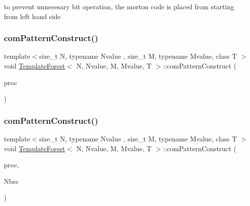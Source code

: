 to prevent unnecesary bit operation, the morton code is placed from starting from left hand side \mbox{\label{classTemplateForest_aa8695400b06ec321a3378ea68dafe4a9}} 
\subsubsection{\texorpdfstring{com\+Pattern\+Construct()}{comPatternConstruct()}\hspace{0.1cm}{\footnotesize\ttfamily [1/2]}}
{\footnotesize\ttfamily template$<$size\+\_\+t N, typename Nvalue , size\+\_\+t M, typename Mvalue, class T $>$ \\
void \mbox{\hyperlink{classTemplateForest}{Template\+Forest}}$<$ N, Nvalue, M, Mvalue, T $>$\+::com\+Pattern\+Construct (\begin{DoxyParamCaption}\item[{\mbox{\hyperlink{classTree}{Tree}}$<$ M, Mvalue $>$ \&}]{proc }\end{DoxyParamCaption})}

\mbox{\label{classTemplateForest_a797a20798c773480c74f6a4c410d6de3}} 
\subsubsection{\texorpdfstring{com\+Pattern\+Construct()}{comPatternConstruct()}\hspace{0.1cm}{\footnotesize\ttfamily [2/2]}}
{\footnotesize\ttfamily template$<$size\+\_\+t N, typename Nvalue , size\+\_\+t M, typename Mvalue, class T $>$ \\
void \mbox{\hyperlink{classTemplateForest}{Template\+Forest}}$<$ N, Nvalue, M, Mvalue, T $>$\+::com\+Pattern\+Construct (\begin{DoxyParamCaption}\item[{\mbox{\hyperlink{classFullTree}{Full\+Tree}}$<$ M, Mvalue $>$ \&}]{proc,  }\item[{vector$<$ \mbox{\hyperlink{definitions_8h_a69aa29b598b851b0640aa225a9e5d61d}{uint}} $>$ \&}]{Nbrs }\end{DoxyParamCaption})}

